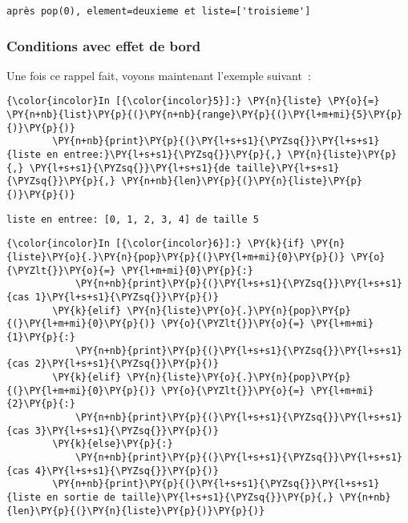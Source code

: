     \begin{Verbatim}[commandchars=\\\{\}]
après pop(0), element=deuxieme et liste=['troisieme']

    \end{Verbatim}

    \hypertarget{conditions-avec-effet-de-bord}{%
\subsubsection{Conditions avec effet de
bord}\label{conditions-avec-effet-de-bord}}

    Une fois ce rappel fait, voyons maintenant l'exemple suivant~:

    \begin{Verbatim}[commandchars=\\\{\}]
{\color{incolor}In [{\color{incolor}5}]:} \PY{n}{liste} \PY{o}{=} \PY{n+nb}{list}\PY{p}{(}\PY{n+nb}{range}\PY{p}{(}\PY{l+m+mi}{5}\PY{p}{)}\PY{p}{)}
        \PY{n+nb}{print}\PY{p}{(}\PY{l+s+s1}{\PYZsq{}}\PY{l+s+s1}{liste en entree:}\PY{l+s+s1}{\PYZsq{}}\PY{p}{,} \PY{n}{liste}\PY{p}{,} \PY{l+s+s1}{\PYZsq{}}\PY{l+s+s1}{de taille}\PY{l+s+s1}{\PYZsq{}}\PY{p}{,} \PY{n+nb}{len}\PY{p}{(}\PY{n}{liste}\PY{p}{)}\PY{p}{)}
\end{Verbatim}


    \begin{Verbatim}[commandchars=\\\{\}]
liste en entree: [0, 1, 2, 3, 4] de taille 5

    \end{Verbatim}

    \begin{Verbatim}[commandchars=\\\{\}]
{\color{incolor}In [{\color{incolor}6}]:} \PY{k}{if} \PY{n}{liste}\PY{o}{.}\PY{n}{pop}\PY{p}{(}\PY{l+m+mi}{0}\PY{p}{)} \PY{o}{\PYZlt{}}\PY{o}{=} \PY{l+m+mi}{0}\PY{p}{:}
            \PY{n+nb}{print}\PY{p}{(}\PY{l+s+s1}{\PYZsq{}}\PY{l+s+s1}{cas 1}\PY{l+s+s1}{\PYZsq{}}\PY{p}{)}
        \PY{k}{elif} \PY{n}{liste}\PY{o}{.}\PY{n}{pop}\PY{p}{(}\PY{l+m+mi}{0}\PY{p}{)} \PY{o}{\PYZlt{}}\PY{o}{=} \PY{l+m+mi}{1}\PY{p}{:}
            \PY{n+nb}{print}\PY{p}{(}\PY{l+s+s1}{\PYZsq{}}\PY{l+s+s1}{cas 2}\PY{l+s+s1}{\PYZsq{}}\PY{p}{)}
        \PY{k}{elif} \PY{n}{liste}\PY{o}{.}\PY{n}{pop}\PY{p}{(}\PY{l+m+mi}{0}\PY{p}{)} \PY{o}{\PYZlt{}}\PY{o}{=} \PY{l+m+mi}{2}\PY{p}{:}
            \PY{n+nb}{print}\PY{p}{(}\PY{l+s+s1}{\PYZsq{}}\PY{l+s+s1}{cas 3}\PY{l+s+s1}{\PYZsq{}}\PY{p}{)}
        \PY{k}{else}\PY{p}{:}
            \PY{n+nb}{print}\PY{p}{(}\PY{l+s+s1}{\PYZsq{}}\PY{l+s+s1}{cas 4}\PY{l+s+s1}{\PYZsq{}}\PY{p}{)}
        \PY{n+nb}{print}\PY{p}{(}\PY{l+s+s1}{\PYZsq{}}\PY{l+s+s1}{liste en sortie de taille}\PY{l+s+s1}{\PYZsq{}}\PY{p}{,} \PY{n+nb}{len}\PY{p}{(}\PY{n}{liste}\PY{p}{)}\PY{p}{)}
\end{Verbatim}


